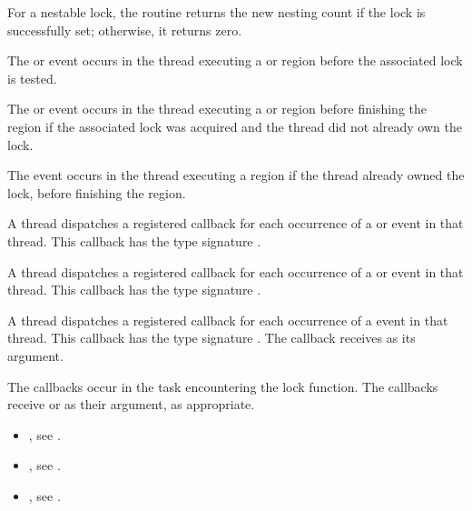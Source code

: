 For a nestable lock, the  routine returns the new nesting count
if the lock is successfully set; otherwise, it returns zero.

\events

The  or  event occurs in the thread
executing a  or  region
before the associated lock is tested.

The  or  event occurs in the thread
executing a  or  region
before finishing the region if the associated lock was acquired and the thread did not already own the lock.

The  event occurs in the thread
executing a  region
if the thread already owned the lock,
before finishing the region.


\tools

A thread dispatches a registered 
callback for each occurrence of a  or  event
in that thread.  This callback has the type signature .

A thread dispatches a registered 
callback for each occurrence of a  or  event
in that thread.  This callback has the type signature .

A thread dispatches a registered 
callback for each occurrence of a  event
in that thread. This callback has the type signature .
The callback receives  as its  argument.

The callbacks occur in the task encountering
the lock function.  The callbacks receive  or
  as their  argument, as appropriate.


\crossreferences
\begin{itemize}
\item {}, see
.
\item {}, see
.
\item {}, see
.
\end{itemize}

